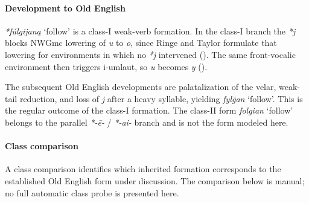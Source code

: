 \documentclass[
  british,
  a4paper,
]{article}
\providecommand{\Recon}[1]{\emph{*#1}}
\begin{document}
\paragraph{Development to Old
English}\label{development-to-old-english-89}

\Recon{fúlgijaną} `follow' is a class-I weak-verb formation. In the
class-I branch the \emph{*j} blocks NWGmc lowering of \emph{u} to
\emph{o}, since Ringe and Taylor formulate that lowering for
environments in which no \emph{*j} intervened
(). The same
front-vocalic environment then triggers i-umlaut, so \emph{u} becomes
\emph{y} ().

The subsequent Old English developments are palatalization of the velar,
weak-tail reduction, and loss of \emph{j} after a heavy syllable,
yielding {\emph{fylġan}} `follow'. This is the regular outcome of the
class-I formation. The class-II form {\emph{folgian}} `follow' belongs
to the parallel \emph{*-ē-} / \emph{*-ai-} branch and is not the form
modeled here.

\paragraph{Class comparison}\label{class-comparison-1}

A class comparison identifies which inherited formation corresponds to
the established Old English form under discussion. The comparison below
is manual; no full automatic class probe is presented here.
\end{document}
